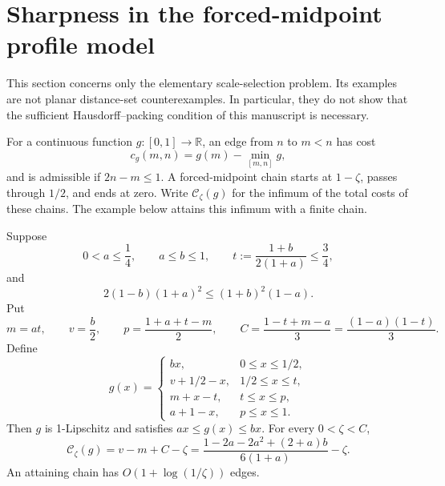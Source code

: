 \section{Sharpness in the forced-midpoint profile model}
\label{pfobs:section}

This section concerns only the elementary scale-selection problem. Its examples
are not planar distance-set counterexamples. In particular, they do not show that
the sufficient Hausdorff--packing condition of this manuscript is necessary.

For a continuous function \(g:[0,1]\to\mathbb R\), an edge from \(n\) to
\(m<n\) has cost
$$
 c_g(m,n)=g(m)-\min_{[m,n]}g,
$$
and is admissible if \(2n-m\le1\). A forced-midpoint chain starts at
\(1-\zeta\), passes through \(1/2\), and ends at zero. Write
\(\mathcal C_\zeta(g)\) for the infimum of the total costs of these chains.
The example below attains this infimum with a finite chain.

\begin{proposition}\label{pfobs:exact}
Suppose
$$
 0<a\le\frac14,\qquad a\le b\le1,\qquad
 t:=\frac{1+b}{2(1+a)}\le\frac34,
$$
and
\begin{equation}\label{pfobs:barrier-condition}
 2(1-b)(1+a)^2\le(1+b)^2(1-a).
\end{equation}
Put
$$
 m=at,\qquad v=\frac b2,\qquad
 p=\frac{1+a+t-m}{2},\qquad
 C=\frac{1-t+m-a}{3}=\frac{(1-a)(1-t)}3.
$$
Define
\begin{equation}\label{pfobs:profile}
 g(x)=\begin{cases}
 bx,&0\le x\le1/2,\\
 v+1/2-x,&1/2\le x\le t,\\
 m+x-t,&t\le x\le p,\\
 a+1-x,&p\le x\le1.
 \end{cases}
\end{equation}
Then \(g\) is 1-Lipschitz and satisfies \(ax\le g(x)\le bx\).
For every \(0<\zeta<C\),
\begin{equation}\label{pfobs:exact-cost}
 \mathcal C_\zeta(g)=v-m+C-\zeta
 =\frac{1-2a-2a^2+(2+a)b}{6(1+a)}-\zeta.
\end{equation}
An attaining chain has \(O(1+\log(1/\zeta))\) edges.
\end{proposition}

